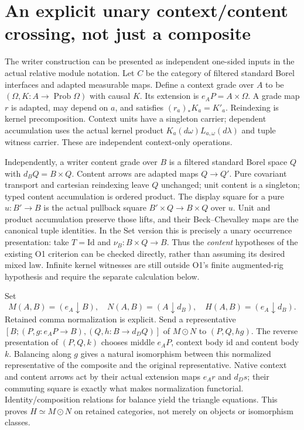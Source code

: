 \documentclass[11pt]{article}
\begin{document}
\section{An explicit unary context/content crossing, not just a composite}
The writer construction can be presented as independent one-sided inputs in the actual relative module notation. Let $C$ be the category of filtered standard Borel interfaces and adapted measurable maps. Define a context grade over $A$ to be $(\Omega,K:A\to\operatorname{Prob}\Omega)$ with causal $K$. Its extension is $e_AP=A\times\Omega$. A grade map $r$ is adapted, may depend on $a$, and satisfies $(r_a)_*K_a=K'_a$. Reindexing is kernel precomposition. Context units have a singleton carrier; dependent accumulation uses the actual kernel product $K_a(d\omega)L_{a,\omega}(d\lambda)$ and tuple witness carrier. These are independent context-only operations.

Independently, a writer content grade over $B$ is a filtered standard Borel space $Q$ with $d_BQ=B\times Q$. Content arrows are adapted maps $Q\to Q'$. Pure covariant transport and cartesian reindexing leave $Q$ unchanged; unit content is a singleton; typed content accumulation is ordered product. The display square for a pure $u:B'\to B$ is the actual pullback square $B'\times Q\to B\times Q$ over $u$. Unit and product accumulation preserve those lifts, and their Beck--Chevalley maps are the canonical tuple identities. In the Set version this is precisely a unary occurrence presentation: take $T=\mathrm{Id}$ and $\nu_B:B\times Q\to B$. Thus the \emph{content} hypotheses of the existing O1 criterion can be checked directly, rather than assuming its desired mixed law. Infinite kernel witnesses are still outside O1's finite augmented-rig hypothesis and require the separate calculation below.

Set
\[
 M(A,B)=(e_A\downarrow B),\quad N(A,B)=(A\downarrow d_B),\quad
 H(A,B)=(e_A\downarrow d_B).
\]
Retained comma normalization is explicit. Send a representative
$[B;(P,g:e_AP\to B),(Q,h:B\to d_DQ)]$ of $M\odot N$ to $(P,Q,hg)$. The reverse presentation of $(P,Q,k)$ chooses middle $e_AP$, context body $\mathrm{id}$ and content body $k$. Balancing along $g$ gives a natural isomorphism between this normalized representative of the composite and the original representative. Native context and content arrows act by their actual extension maps $e_A r$ and $d_Ds$; their commuting square is exactly what makes normalization functorial. Identity/composition relations for balance yield the triangle equations. This proves $H\simeq M\odot N$ on retained categories, not merely on objects or isomorphism classes.
\end{document}
